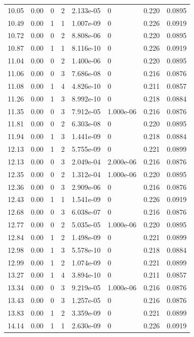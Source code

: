 \documentclass[preview]{standalone}
\begin{document}
{{{\begin{tabular}{L{1.2cm}C{1.2cm} C{0.3cm}C{0.5cm} C{1.4cm}C{1.4cm} C{1.4cm}C{1.4cm}}
  10.05  &  0.00  & 0     &  2 &  2.133e-05  & 0  & 0.220 &  0.0895   \\ 
  10.49  &  0.00  & 1     &  1 &  1.007e-09  & 0  & 0.226 &  0.0919   \\ 
  10.72  &  0.00  & 0     &  2 &  8.808e-06  & 0  & 0.220 &  0.0895   \\ 
  10.87  &  0.00  & 1     &  1 &  8.116e-10  & 0  & 0.226 &  0.0919   \\ 
  11.04  &  0.00  & 0     &  2 &  1.400e-06  & 0  & 0.220 &  0.0895   \\ 
  11.06  &  0.00  & 0     &  3 &  7.686e-08  & 0  & 0.216 &  0.0876   \\ 
  11.08  &  0.00  & 1     &  4 &  4.826e-10  & 0  & 0.211 &  0.0857   \\ 
  11.26  &  0.00  & 1     &  3 &  8.992e-10  & 0  & 0.218 &  0.0884   \\ 
  11.35  &  0.00  & 0     &  3 &  7.912e-05  & 1.000e-06  & 0.216 &  0.0876   \\ 
  11.81  &  0.00  & 0     &  2 &  6.303e-08  & 0  & 0.220 &  0.0895   \\ 
  11.94  &  0.00  & 1     &  3 &  1.441e-09  & 0  & 0.218 &  0.0884   \\ 
  12.13  &  0.00  & 1     &  2 &  5.755e-09  & 0  & 0.221 &  0.0899   \\ 
  12.13  &  0.00  & 0     &  3 &  2.049e-04  & 2.000e-06  & 0.216 &  0.0876   \\ 
  12.35  &  0.00  & 0     &  2 &  1.312e-04  & 1.000e-06  & 0.220 &  0.0895   \\ 
  12.36  &  0.00  & 0     &  3 &  2.909e-06  & 0  & 0.216 &  0.0876   \\ 
  12.43  &  0.00  & 1     &  1 &  1.541e-09  & 0  & 0.226 &  0.0919   \\ 
  12.68  &  0.00  & 0     &  3 &  6.038e-07  & 0  & 0.216 &  0.0876   \\ 
  12.77  &  0.00  & 0     &  2 &  5.035e-05  & 1.000e-06  & 0.220 &  0.0895   \\ 
  12.84  &  0.00  & 1     &  2 &  1.498e-09  & 0  & 0.221 &  0.0899   \\ 
  12.98  &  0.00  & 1     &  3 &  5.578e-10  & 0  & 0.218 &  0.0884   \\ 
  12.99  &  0.00  & 1     &  2 &  1.074e-09  & 0  & 0.221 &  0.0899   \\ 
  13.27  &  0.00  & 1     &  4 &  3.894e-10  & 0  & 0.211 &  0.0857   \\ 
  13.34  &  0.00  & 0     &  3 &  9.219e-05  & 1.000e-06  & 0.216 &  0.0876   \\ 
  13.43  &  0.00  & 0     &  3 &  1.257e-05  & 0  & 0.216 &  0.0876   \\ 
  13.83  &  0.00  & 1     &  2 &  3.359e-09  & 0  & 0.221 &  0.0899   \\ 
  14.14  &  0.00  & 1     &  1 &  2.630e-09  & 0  & 0.226 &  0.0919   \\ 
\hline 
\end{tabular} 

}}}
\end{document}
